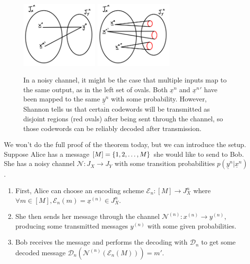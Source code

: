 \begin{figure}
    \centering
    \includegraphics[width=0.35\textwidth]{2019/01/20190125_noisychannel1.png}
    \includegraphics[width=0.35\textwidth]{2019/01/20190125_noisychannel2.png}
    \caption{In a noisy channel, it might be the case that multiple inputs map to the same output, as in the left set of ovals. Both $\underline{x}^n$ and $\underline{x}^n{}'$ have been mapped to the same $\underline{y}^n$ with some probability. However, Shannon tells us that certain codewords will be transmitted as disjoint regions (red ovals) after being sent through the channel, so those codewords can be reliably decoded after transmission.}
    \label{fig:noisychannel}
\end{figure}

We won't do the full proof of the theorem today, but we can introduce the setup. Suppose Alice has a message $[M]=\{1,2,\ldots, M\}$ she would like to send to Bob. She has a noisy channel $\mathcal{N}:J_X \to J_Y$ with some transition probabilities $p(\underline y^{n}| \underline x^{n})$.



\begin{enumerate}
    \item First, Alice can choose an encoding scheme $\mathcal{E}_n:[M]\to J_X^n$ where $\forall m\in [M], \mathcal{E}_n(m)=\underline x^{(n)} \in J_X^n$.
    \item She then sends her message through the channel $\mathcal{N}^{(n)}:x^{(n)}\to y^{(n)}$, producing some transmitted messages $y^{(n)}$ with some given probabilities.
    \item Bob receives the message and performs the decoding with $\mathcal{D}_n$ to get some decoded message $\mathcal{D}_n(\mathcal{N}^{(n)}(\mathcal{E}_n(M)))=m'$.
\end{enumerate}

